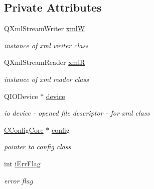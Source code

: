\subsection*{Private Attributes}
\begin{DoxyCompactItemize}
\item 
\hypertarget{classCInputCA_ae2dee0e7b63f91a0b59e7046da822f00}{
QXmlStreamWriter \hyperlink{classCInputCA_ae2dee0e7b63f91a0b59e7046da822f00}{xmlW}}
\label{classCInputCA_ae2dee0e7b63f91a0b59e7046da822f00}

\begin{DoxyCompactList}\small\item\em instance of xml writer class \item\end{DoxyCompactList}\item 
\hypertarget{classCInputCA_a87d6b8ee4c79d3b123ae01fd2e89e7dc}{
QXmlStreamReader \hyperlink{classCInputCA_a87d6b8ee4c79d3b123ae01fd2e89e7dc}{xmlR}}
\label{classCInputCA_a87d6b8ee4c79d3b123ae01fd2e89e7dc}

\begin{DoxyCompactList}\small\item\em instance of xml reader class \item\end{DoxyCompactList}\item 
\hypertarget{classCInputCA_a4843f4b7db0265e6ed822774e9488f26}{
QIODevice $\ast$ \hyperlink{classCInputCA_a4843f4b7db0265e6ed822774e9488f26}{device}}
\label{classCInputCA_a4843f4b7db0265e6ed822774e9488f26}

\begin{DoxyCompactList}\small\item\em io device -\/ opened file descriptor -\/ for xml class \item\end{DoxyCompactList}\item 
\hypertarget{classCInputCA_a02734fb078a9585be8f16d9b1b16eca3}{
\hyperlink{classCConfigCore}{CConfigCore} $\ast$ \hyperlink{classCInputCA_a02734fb078a9585be8f16d9b1b16eca3}{config}}
\label{classCInputCA_a02734fb078a9585be8f16d9b1b16eca3}

\begin{DoxyCompactList}\small\item\em pointer to config class \item\end{DoxyCompactList}\item 
\hypertarget{classCInputCA_a14cc46d0856a6f462c622aac7498b3b9}{
int \hyperlink{classCInputCA_a14cc46d0856a6f462c622aac7498b3b9}{iErrFlag}}
\label{classCInputCA_a14cc46d0856a6f462c622aac7498b3b9}

\begin{DoxyCompactList}\small\item\em error flag \item\end{DoxyCompactList}\end{DoxyCompactItemize}


